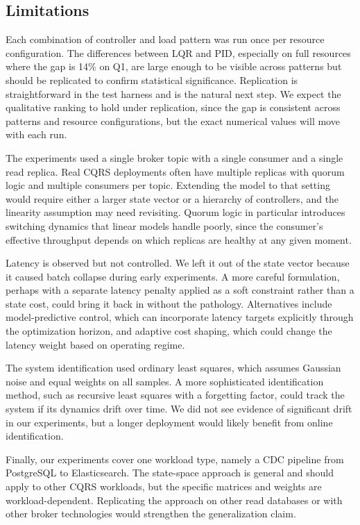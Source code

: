 \documentclass[10pt,a4paper]{article}
\begin{document}
\subsection{Limitations}

Each combination of controller and load pattern was run once per resource configuration. The differences between LQR and PID, especially on full resources where the gap is 14\% on Q1, are large enough to be visible across patterns but should be replicated to confirm statistical significance. Replication is straightforward in the test harness and is the natural next step. We expect the qualitative ranking to hold under replication, since the gap is consistent across patterns and resource configurations, but the exact numerical values will move with each run.

The experiments used a single broker topic with a single consumer and a single read replica. Real CQRS deployments often have multiple replicas with quorum logic and multiple consumers per topic. Extending the model to that setting would require either a larger state vector or a hierarchy of controllers, and the linearity assumption may need revisiting. Quorum logic in particular introduces switching dynamics that linear models handle poorly, since the consumer's effective throughput depends on which replicas are healthy at any given moment.

Latency is observed but not controlled. We left it out of the state vector because it caused batch collapse during early experiments. A more careful formulation, perhaps with a separate latency penalty applied as a soft constraint rather than a state cost, could bring it back in without the pathology. Alternatives include model-predictive control, which can incorporate latency targets explicitly through the optimization horizon, and adaptive cost shaping, which could change the latency weight based on operating regime.

The system identification used ordinary least squares, which assumes Gaussian noise and equal weights on all samples. A more sophisticated identification method, such as recursive least squares with a forgetting factor, could track the system if its dynamics drift over time. We did not see evidence of significant drift in our experiments, but a longer deployment would likely benefit from online identification.

Finally, our experiments cover one workload type, namely a CDC pipeline from PostgreSQL to Elasticsearch. The state-space approach is general and should apply to other CQRS workloads, but the specific matrices and weights are workload-dependent. Replicating the approach on other read databases or with other broker technologies would strengthen the generalization claim.
\end{document}
